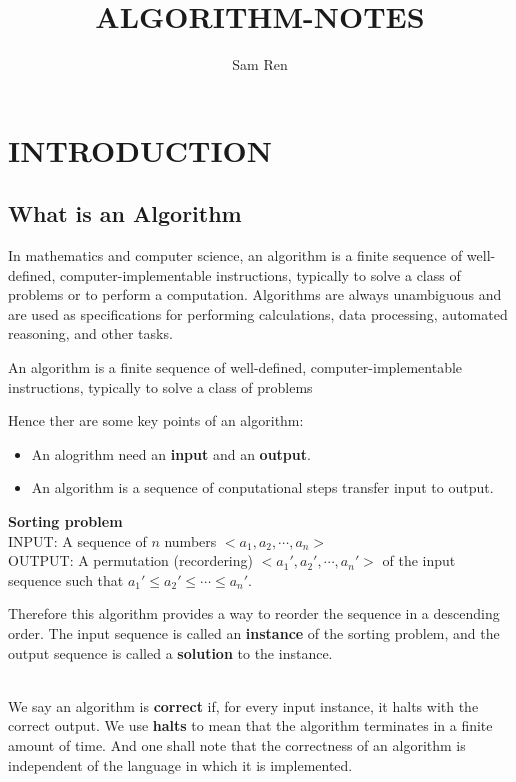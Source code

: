 \documentclass{article}
\title{ALGORITHM-NOTES}
\author{Sam Ren}
\theoremstyle{mytheoremstyle}
\theoremstyle{mytheoremstyle}
\theoremstyle{myproblemstyle}
\theoremstyle{myproblemstyle}
\begin{document}
    \maketitle
\section{INTRODUCTION}
\subsection{What is an Algorithm}
In mathematics and computer science, an algorithm is a finite sequence of well-defined, computer-implementable instructions, typically to solve a class of problems or to perform a computation. Algorithms are always unambiguous and are used as specifications for performing calculations, data processing, automated reasoning, and other tasks.
\begin{definition}[Algorithm]
  An algorithm is a finite sequence of well-defined, computer-implementable instructions, typically to solve a class of problems
\end{definition}

Hence ther are some key points of an algorithm:
\begin{itemize}
  \item An alogrithm need an \textbf{input} and an \textbf{output}.
  \item An algorithm is a sequence of conputational steps transfer input to output.
\end{itemize}

\begin{example}
 \textbf{Sorting problem}
 \\
INPUT: A sequence of $n$ numbers $<a_1,a_2,\cdots,a_n>$\\
OUTPUT: A permutation (recordering) $<a_1',a_2',\cdots,a_n'>$ of the input sequence such that $a_1'\leq a_2'\leq \cdots \leq a_n'$.
\end{example}

Therefore this algorithm provides a way to reorder the sequence in a descending order.
The input sequence is called an \textbf{instance} of the sorting problem, and the output sequence is called a \textbf{solution} to the instance.

\\
We say an algorithm is \textbf{correct} if, for every input instance, it halts with the correct output.
We use \textbf{halts} to mean that the algorithm terminates in a finite amount of time.
And one shall note that the correctness of an algorithm is independent of the language in which it is implemented.
\end{document}
